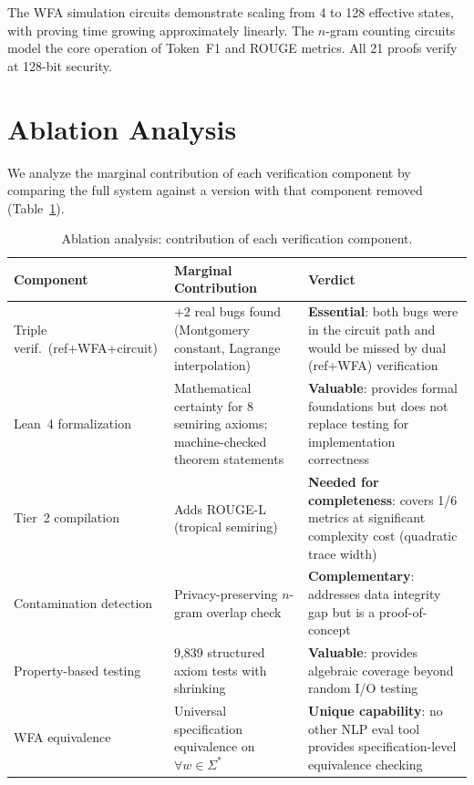 \documentclass[11pt]{article}
\begin{document}
\noindent The WFA simulation circuits demonstrate scaling from 4 to
128 effective states, with proving time growing approximately linearly.
The $n$-gram counting circuits model the core operation of Token~F1
and ROUGE metrics.  All 21 proofs verify at 128-bit security.


\section{Ablation Analysis}\label{app:ablation}

We analyze the marginal contribution of each verification component
by comparing the full system against a version with that component
removed (Table~\ref{tab:ablation}).

\begin{table}[h]
\centering\small
\caption{Ablation analysis: contribution of each verification component.}\label{tab:ablation}
\smallskip
\begin{tabular}{@{}p{2.3cm}p{3.2cm}p{5.5cm}@{}}
\toprule
\textbf{Component} & \textbf{Marginal Contribution} & \textbf{Verdict} \\
\midrule
Triple verif.\ (ref+WFA+circuit) &
  $+2$ real bugs found (Montgomery constant, Lagrange interpolation) &
  \textbf{Essential}: both bugs were in the circuit path and would
  be missed by dual (ref+WFA) verification \\
\midrule
Lean~4 formalization &
  Mathematical certainty for 8 semiring axioms;
  machine-checked theorem statements &
  \textbf{Valuable}: provides formal foundations but does not replace
  testing for implementation correctness \\
\midrule
Tier~2 compilation &
  Adds ROUGE-L (tropical semiring) &
  \textbf{Needed for completeness}: covers 1/6 metrics at significant
  complexity cost (quadratic trace width) \\
\midrule
Contamination detection &
  Privacy-preserving $n$-gram overlap check &
  \textbf{Complementary}: addresses data integrity gap but is a
  proof-of-concept \\
\midrule
Property-based testing &
  9{,}839 structured axiom tests with shrinking &
  \textbf{Valuable}: provides algebraic coverage beyond random I/O testing \\
\midrule
WFA equivalence &
  Universal specification equivalence on $\forall w \in \Sigma^*$ &
  \textbf{Unique capability}: no other NLP eval tool provides
  specification-level equivalence checking \\
\bottomrule
\end{tabular}
\end{table}
\end{document}
